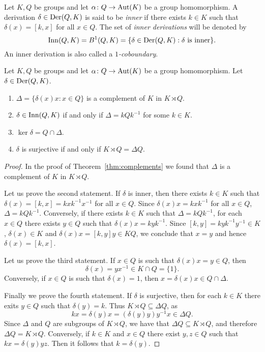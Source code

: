 Let $K,Q$ be groups and let $\alpha\colon Q\rightarrow \operatorname{Aut}(K)$ be a group homomorphism.
A derivation $\delta\in\operatorname{Der}(Q,K)$ is said to be {\em inner} if there exists $k\in K$ 
such that $\delta(x)=[k,x]$ for all $x\in Q$. The set of 
{\em inner derivations} will be denoted by 
\[
		\mathrm{Inn}(Q,K)=B^1(Q,K)=\{\delta\in\operatorname{Der}(Q,K):\text{$\delta$ is inner}\}.
\]
An inner derivation is also called a {\em $1$-coboundary}.

\begin{theorem}[Sysak]
	\label{theorem:Sysak}
	Let $K,Q$ be groups and let $\alpha\colon Q\rightarrow \operatorname{Aut}(K)$ be a group homomorphism. Let
	$\delta\in\operatorname{Der}(Q,K)$.
	\begin{enumerate}
		\item $\Delta=\{\delta(x)x:x\in Q\}$ is a complement of $K$ in $K\rtimes Q$.
		\item $\delta\in\mathrm{Inn}(Q,K)$ if and only if $\Delta=kQ k^{-1}$ for some $k\in K$.
		\item $\ker\delta=Q\cap\Delta$.
		\item $\delta$ is surjective if and only if $K\rtimes Q=\Delta Q$.
	\end{enumerate}
\end{theorem}

\begin{proof}
	In the proof of Theorem~\ref{thm:complements} we 
	found that $\Delta$ is a complement of $K$ in $K\rtimes Q$. 

	Let us prove the second statement. If $\delta$ is inner, then there exists 
    $k\in K$ such that $\delta(x)=[k,x]=kxk^{-1}x^{-1}$ for all $x\in
	Q$. Since $\delta(x)x=kxk^{-1}$ for all $x\in Q$,  $\Delta=kQk^{-1}$.
	Conversely, if there exists $k\in K$ such that $\Delta=kQk^{-1}$, for each 
	$x\in Q$ there exists $y\in Q$ such that $\delta(x)x=kyk^{-1}$. Since
	$[k,y]=kyk^{-1}y^{-1}\in K$, $\delta(x)\in K$ and $\delta(x)x=[k,y]y\in KQ$,
	we conclude that  $x=y$ and hence $\delta(x)=[k,x]$. 

	Let us prove the third statement. If $x\in Q$ is such that $\delta(x)x=y\in
	Q$, then \[
	\delta(x)=yx^{-1}\in K\cap Q=\{1\}.
	\]
	Conversely, if $x\in Q$
	is such that $\delta(x)=1$, then $x=\delta(x)x\in Q\cap\Delta$. 

	Finally we prove the fourth statement. If $\delta$ is surjective, then for each 
	$k\in K$ there exits $y\in Q$ such that $\delta(y)=k$. Thus $K\rtimes Q\subseteq
	\Delta Q$, as 
	\[
	kx=\delta(y)x=(\delta(y)y)y^{-1}x\in \Delta Q.
	\]
	Since $\Delta$ and $Q$ are subgroups of $K\rtimes Q$, we have that 
	$\Delta Q\subseteq K\rtimes Q$, and therefore $\Delta Q=K\rtimes Q$.
	Conversely, if $k\in K$ and $x\in Q$ there exist  
	$y,z\in Q$ such that $kx=\delta(y)yz$. Then it follows that 
	$k=\delta(y)$. 
\end{proof}

